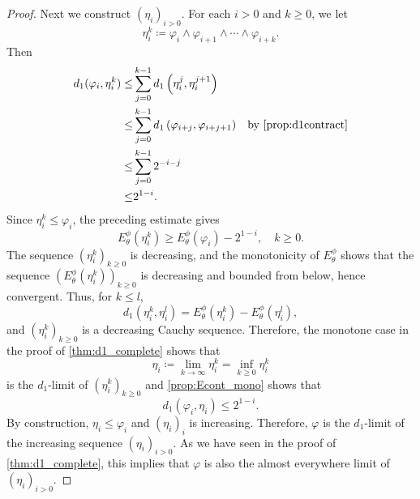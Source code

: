 \begin{proof}
    Next we construct $(\eta_i)_{i>0}$.
    For each $i>0$ and $k\geq 0$, we let
    \[
    \eta_i^k\coloneqq \varphi_i\land \varphi_{i+1}\land \cdots\land \varphi_{i+k}.
    \]
    Then
    \[
    \begin{aligned}
    d_1(\varphi_i,\eta_i^k)\leq & \sum_{j=0}^{k-1} d_1\left(\eta_i^j,\eta_i^{j+1}\right)\\
    \leq &\sum_{j=0}^{k-1} d_1\left(\varphi_{i+j},\varphi_{i+j+1}\right) &\textup{by \cref{prop:d1contract}}\\
    \leq & \sum_{j=0}^{k-1} 2^{-i-j}\\
    \leq & 2^{1-i}.
    \end{aligned}
    \]
    Since $\eta_i^k\leq \varphi_i$, the preceding estimate gives
    \[
        E_{\theta}^{\phi}(\eta_i^k)\geq E_{\theta}^{\phi}(\varphi_i)-2^{1-i},\quad k\geq 0.
    \]
    The sequence $(\eta_i^k)_{k\geq 0}$ is decreasing, and the monotonicity of $E_{\theta}^{\phi}$ shows that the sequence $\left(E_{\theta}^{\phi}(\eta_i^k)\right)_{k\geq 0}$ is decreasing and bounded from below, hence convergent. Thus, for $k\leq l$,
    \[
        d_1(\eta_i^k,\eta_i^l)=E_{\theta}^{\phi}(\eta_i^k)-E_{\theta}^{\phi}(\eta_i^l),
    \]
    and $(\eta_i^k)_{k\geq 0}$ is a decreasing Cauchy sequence. Therefore, the monotone case in the proof of \cref{thm:d1_complete} shows that
    \[
    \eta_i\coloneqq \lim_{k\to\infty}\eta_i^k=\inf_{k\geq 0} \eta_i^k
    \]
    is the $d_1$-limit of $(\eta_i^k)_{k\geq 0}$ and \cref{prop:Econt_mono} shows that
    \[
    d_1(\varphi_i,\eta_i)\leq 2^{1-i}.
    \]
    By construction, $\eta_i\leq \varphi_i$ and $(\eta_i)_i$ is increasing. Therefore, $\varphi$ is the $d_1$-limit of the increasing sequence $(\eta_i)_{i>0}$. As we have seen in the proof of \cref{thm:d1_complete}, this implies that $\varphi$ is also the almost everywhere limit of $(\eta_i)_{i>0}$.
\end{proof}

